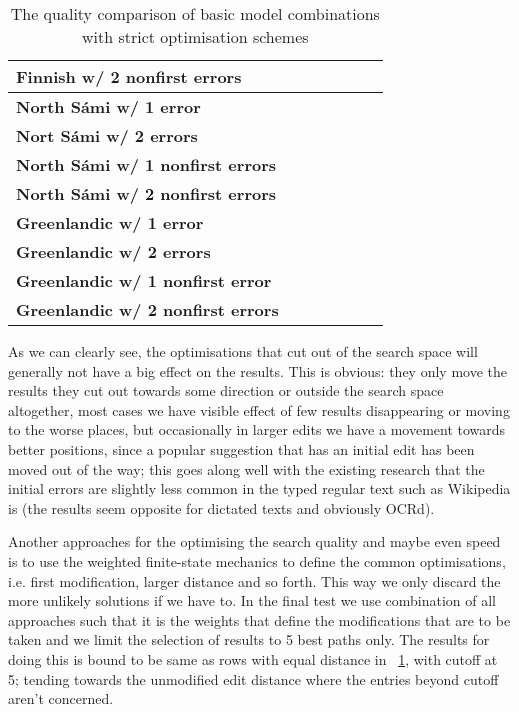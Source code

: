 \documentclass[a4paper,12pt]{article}
\begin{document}
\begin{table}
\begin{tabular}{|l|r|r|r|r|r|r|}
        \bf Finnish w/ 2 nonfirst errors & & & & & & \\
        \hline
        \bf North Sámi w/ 1 error & & & & & & \\
        \bf Nort Sámi w/ 2 errors & & & & & & \\
        \bf North Sámi w/ 1 nonfirst errors & & & & & & \\
        \bf North Sámi w/ 2 nonfirst errors & & & & & & \\
        \hline
        \bf Greenlandic w/ 1 error & & & & & & \\
       \bf Greenlandic w/ 2 errors & & & & & & \\
        \bf Greenlandic w/ 1 nonfirst error & & & & & & \\
       \bf Greenlandic w/ 2 nonfirst errors & & & & & & \\
        \hline
    \end{tabular}
    \caption{The quality comparison of basic model combinations with strict
    optimisation schemes\label{table:optimisation-quality}}
\end{table}

As we can clearly see, the optimisations that cut out of the search space will
generally not have a big effect on the results. This is obvious: they only move
the results they cut out towards some direction or outside the search space
altogether, most cases we have visible effect of few results disappearing or
moving to the worse places, but occasionally in larger edits we have a movement
towards better positions, since a popular suggestion that has an initial edit
has been moved out of the way; this goes along well with the existing research
that the initial errors are slightly less common in the typed regular text such
as Wikipedia is (the results seem opposite for dictated texts and obviously
OCRd).

Another approaches for the optimising the search quality and maybe even speed
is to use the weighted finite-state mechanics to define the common
optimisations, i.e. first modification, larger distance and so forth. This way
we only discard the more unlikely solutions if we have to. In the final test we
use combination of all approaches such that it is the weights that define the
modifications that are to be taken and we limit the selection of results to 5
best paths only. The results for doing this is bound to be same as rows with
equal distance in ~\ref{table:optimisation-quality}, with cutoff at 5; tending
towards the unmodified edit distance where the entries beyond cutoff aren't
concerned.
\end{document}
